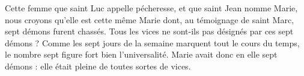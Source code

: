  Cette femme que saint Luc appelle pécheresse, et que saint Jean nomme Marie, nous croyons qu’elle est cette même Marie dont, au témoignage de saint Marc, sept démons furent chassés. Tous les vices ne sont-ils pas désignés par ces sept démons ? Comme les sept jours de la semaine marquent tout le cours du temps, le nombre sept figure fort bien l’universalité. Marie avait donc en elle sept démons : elle était pleine de toutes sortes de vices.